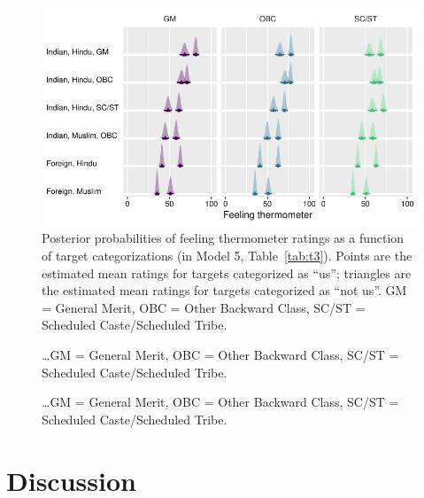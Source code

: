 \documentclass[12pt, a4paper]{article}
\begin{document}
\begin{figure}
\centering
\includegraphics[scale=1]{../figures/figure-6}
\caption{
Posterior probabilities of feeling thermometer ratings as a function of target categorizations (in Model 5, Table~\ref{tab:t3}). Points are the estimated mean ratings for targets categorized as ``us''; triangles are the estimated mean ratings for targets categorized as ``not us''. GM = General Merit, OBC = Other Backward Class, SC/ST = Scheduled Caste/Scheduled Tribe.
}
\label{fig:f6}
\end{figure}

\begin{figure}
\centering
\caption{\ldots GM = General Merit, OBC = Other Backward Class, SC/ST = Scheduled Caste/Scheduled Tribe.}
\label{fig:f7}
\end{figure}

\begin{figure}
\centering
\caption{\ldots GM = General Merit, OBC = Other Backward Class, SC/ST = Scheduled Caste/Scheduled Tribe.}
\label{fig:f8}
\end{figure}

\section{Discussion}
\end{document}
